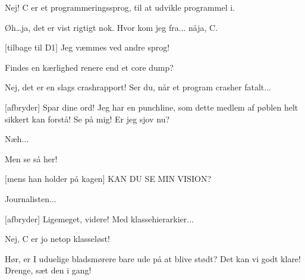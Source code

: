 \documentclass[a4paper,11pt]{article}
\begin{document}
\begin{sketch}

 Nej! C er et programmeringssprog, til at udvikle programmel i.


 Øh\ldots ja, det er vist rigtigt nok.  Hvor kom jeg fra... nåja, C.

[tilbage til D1] Jeg væmmes ved andre sprog!


 Findes en kærlighed renere end et core dump?


 Nej, det er en slags crashrapport!  Ser du, når et program
crasher fatalt...

[afbryder] Spar dine ord!  Jeg har en punchline, som dette
medlem af pøblen helt sikkert kan forstå!  Se på mig!  Er jeg sjov nu?

 Næh...

 Men se så her!


[mens han holder på kagen] KAN DU SE MIN VISION?


 Journalisten...

[afbryder] Ligemeget, videre!  Med klassehierarkier...


 Nej, C er jo netop klasseløst!


 Hør, er I uduelige bladsmørere bare ude på at blive stødt?
Det kan vi godt klare!  Drenge, sæt den i gang!


\end{sketch}
\end{document}
